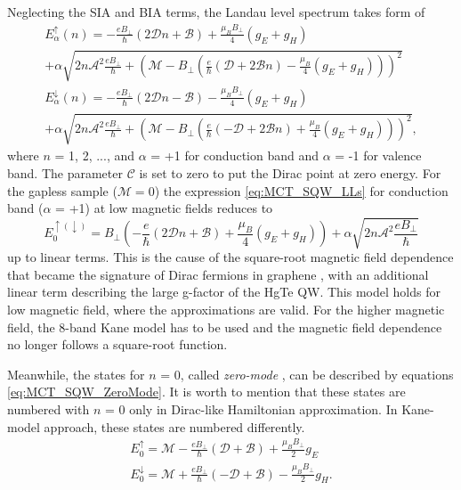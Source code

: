 \documentclass[titlepage,a4paper]{book}
\begin{document}
Neglecting the SIA and BIA terms, the Landau level spectrum takes form of
\begin{equation}
\label{eq:MCT_SQW_LLs}
\begin{aligned}
E^{\uparrow}_{\alpha}(n) = -\frac{eB_{\perp}}{\hbar}(2\mathcal{D}n+\mathcal{B})+\frac{\mu_B B_{\perp}}{4}(g_E + g_H) \\
+ \alpha\sqrt{2n\mathcal{A}^2\frac{eB_{\perp}}{\hbar} + \left(\mathcal{M}-B_{\perp} \left(\frac{e}{\hbar}(\mathcal{D}+2\mathcal{B}n)-\frac{\mu_B}{4}(g_E + g_H)\right)\right)^2} \\
E^{\downarrow}_{\alpha}(n) = -\frac{eB_{\perp}}{\hbar}(2\mathcal{D}n-\mathcal{B})-\frac{\mu_B B_{\perp}}{4}(g_E + g_H) \\
+ \alpha\sqrt{2n\mathcal{A}^2\frac{eB_{\perp}}{\hbar} + \left(\mathcal{M}-B_{\perp} \left(\frac{e}{\hbar}(-\mathcal{D}+2\mathcal{B}n)+\frac{\mu_B}{4}(g_E + g_H)\right)\right)^2}, 
\end{aligned}
\end{equation}
where $n$ = 1, 2, ..., and $\alpha$ = +1 for conduction band and $\alpha$ = -1 for valence band. The parameter $\mathcal{C}$ is set to zero to put the Dirac point at zero energy. For the gapless sample ($\mathcal{M} = 0$) the expression \ref{eq:MCT_SQW_LLs} for conduction band ($\alpha$ = +1) at low magnetic fields reduces to
\begin{equation}
\label{eq:MCT_SQW_LLs2}
E^{\uparrow (\downarrow)}_0 = B_{\perp}\left( -\frac{e}{\hbar}(2\mathcal{D}n+\mathcal{B})+\frac{\mu_B}{4}(g_E + g_H)\right)+\alpha\sqrt{2n\mathcal{A}^2\frac{eB_{\perp}}{\hbar}}
\end{equation}
up to linear terms. This is the cause of the square-root magnetic field dependence that became the signature of Dirac fermions in graphene \cite{Castro_graphene}, with an additional linear term describing the large g-factor of the HgTe QW. This model holds for low magnetic field, where the approximations are valid. For the higher magnetic field, the 8-band Kane model has to be used and the magnetic field dependence no longer follows a square-root function.

Meanwhile, the states for $n$ = 0, called \textit{zero-mode} \cite{Bernevig_Topology2}, can be described by equations \ref{eq:MCT_SQW_ZeroMode}. It is worth to mention that these states are numbered with $n$ = 0 only in Dirac-like Hamiltonian approximation. In Kane-model approach, these states are numbered differently. 
\begin{equation}
\label{eq:MCT_SQW_ZeroMode}
\begin{aligned}
E^{\uparrow}_0 = \mathcal{M} -\frac{eB_{\perp}}{\hbar}(\mathcal{D}+\mathcal{B})+\frac{\mu_B B_{\perp}}{2}g_E \\
E^{\downarrow}_0 = \mathcal{M} +\frac{eB_{\perp}}{\hbar}(-\mathcal{D}+\mathcal{B})-\frac{\mu_B B_{\perp}}{2}g_H.
\end{aligned}
\end{equation}
\end{document}
